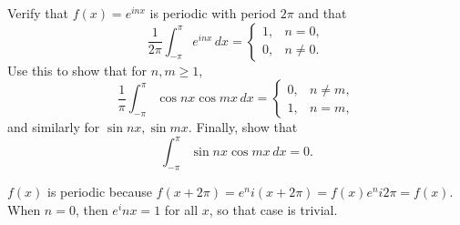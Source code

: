 \documentclass{../note}
\begin{document}
\begin{exercise}{5}
Verify that $f(x) = e^{inx}$ is periodic with period $2\pi$ and that
\[
\frac{1}{2\pi} \int_{-\pi}^{\pi} e^{inx}\,dx =
\begin{cases}
1, & n = 0,\\
0, & n \ne 0.
\end{cases}
\]
Use this to show that for $n,m \ge 1$,
\[
\frac{1}{\pi} \int_{-\pi}^{\pi} \cos nx \cos mx\,dx =
\begin{cases}
0, & n \ne m,\\
1, & n = m,
\end{cases}
\]
and similarly for $\sin nx, \sin mx$. Finally, show that
\[
\int_{-\pi}^{\pi} \sin nx \cos mx\,dx = 0.
\]

\end{exercise}
\begin{solution}
$f(x)$ is periodic because $f(x + 2\pi) = e^ni(x+2\pi) = f(x) e^ni2\pi = f(x)$. When $n = 0$, then $e^inx = 1$ for all $x$, so that case is trivial. 
\end{solution}
\end{document}
